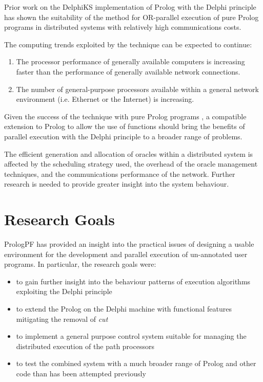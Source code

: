 Prior work on the DelphiKS implementation of Prolog with the Delphi principle
\cite{Kle91, Sar95} has shown the suitability of the method for
OR-parallel execution of pure Prolog programs in distributed systems
with relatively high communications costs.

The computing trends exploited by the technique can be expected to
continue:
\begin{enumerate}
\item{The processor performance of generally available computers
  is increasing faster than the performance of generally available
  network connections.}
\item{The number of general-purpose processors available within
  a general network environment (i.e. Ethernet or the Internet)
  is increasing.}
\end{enumerate}

Given the success of the technique with pure Prolog programs
\cite{Sar95}, a compatible extension to Prolog to allow the use
of functions should bring the benefits of parallel execution
with the Delphi principle to
a broader range of problems.

The efficient generation and allocation of oracles within a distributed system
is affected by the scheduling strategy used, the overhead of the oracle management
techniques, and the communications performance of the network.  Further research is
needed to provide greater insight into the system behaviour.

\section{Research Goals} %

PrologPF has provided an insight into the practical
issues of designing a usable environment for the development and
parallel execution of un-annotated user programs.  In particular, the
research goals were:
\begin{itemize}
\item{to gain further insight into the behaviour patterns of
  execution algorithms exploiting the Delphi principle}
\item{to extend the Prolog on the Delphi machine with functional features
  mitigating the removal of \textit{cut}}
\item{to implement a general purpose control system suitable for
  managing the distributed execution of the path processors}
\item{to test the combined system with a much broader range of
  Prolog and other code than has been attempted previously}
\end{itemize}

